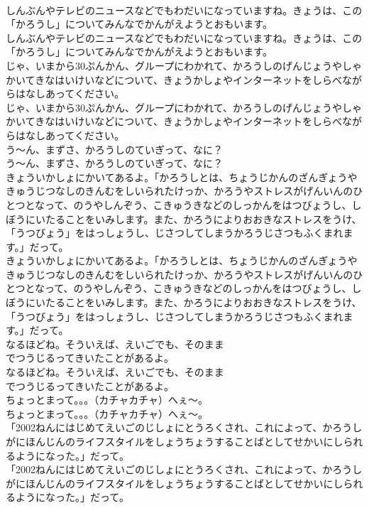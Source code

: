 \documentclass[8pt]{extreport}
\begin{document}
\begin{CJK}{UTF8}{min}
\\	しんぶんやテレビのニュースなどでもわだいになっていますね。きょうは、この「かろうし」についてみんなでかんがえようとおもいます。	
\\	しんぶんやテレビのニュースなどでもわだいになっていますね。きょうは、この「かろうし」についてみんなでかんがえようとおもいます。 
\\	じゃ、いまから30ぷんかん、グループにわかれて、かろうしのげんじょうやしゃかいてきなはいけいなどについて、きょうかしょやインターネットをしらべながらはなしあってください。	
\\	じゃ、いまから30ぷんかん、グループにわかれて、かろうしのげんじょうやしゃかいてきなはいけいなどについて、きょうかしょやインターネットをしらべながらはなしあってください。 
\\	う～ん、まずさ、かろうしのていぎって、なに？	
\\	う～ん、まずさ、かろうしのていぎって、なに？ 
\\	きょういかしょにかいてあるよ。「かろうしとは、ちょうじかんのざんぎょうやきゅうじつなしのきんむをしいられたけっか、かろうやストレスがげんいんのひとつとなって、のうやしんぞう、こきゅうきなどのしっかんをはつびょうし、しぼうにいたることをいみします。また、かろうによりおおきなストレスをうけ、「うつびょう」をはっしょうし、じさつしてしまうかろうじさつもふくまれます。」だって。	
\\	きょういかしょにかいてあるよ。「かろうしとは、ちょうじかんのざんぎょうやきゅうじつなしのきんむをしいられたけっか、かろうやストレスがげんいんのひとつとなって、のうやしんぞう、こきゅうきなどのしっかんをはつびょうし、しぼうにいたることをいみします。また、かろうによりおおきなストレスをうけ、「うつびょう」をはっしょうし、じさつしてしまうかろうじさつもふくまれます。」だって。 
\\	なるほどね。そういえば、えいごでも、そのまま 
\\	でつうじるってきいたことがあるよ。	
\\	なるほどね。そういえば、えいごでも、そのまま 
\\	でつうじるってきいたことがあるよ。 
\\	ちょっとまって。。。（カチャカチャ）へぇ～。	
\\	ちょっとまって。。。（カチャカチャ）へぇ～。 
\\	「2002ねんにはじめてえいごのじしょにとうろくされ、これによって、かろうしがにほんじんのライフスタイルをしょうちょうすることばとしてせかいにしられるようになった。」だって。	
\\	「2002ねんにはじめてえいごのじしょにとうろくされ、これによって、かろうしがにほんじんのライフスタイルをしょうちょうすることばとしてせかいにしられるようになった。」だって。 

\end{CJK}
\end{document}
